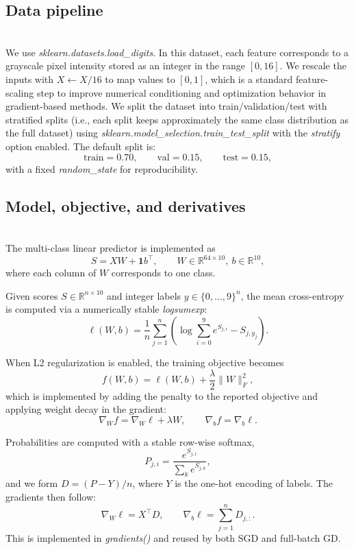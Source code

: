 \subsection{Data pipeline}\;\\
We use \emph{sklearn.datasets.load\_digits}. In this dataset, each feature corresponds to a grayscale pixel intensity stored as an integer in the range $[0,16]$.
We rescale the inputs with $X \leftarrow X/16$ to map values to $[0,1]$, which is a standard feature-scaling step to improve numerical conditioning and optimization behavior in gradient-based methods. \cite[Ch. 12.2.1]{Goodfellow2016}
We split the dataset into train/validation/test with stratified splits (i.e., each split keeps approximately the same class distribution as the full dataset) using \emph{sklearn.model\_selection.train\_test\_split} with the \emph{stratify} option enabled. The default split is:
\[
\text{train}=0.70,\qquad \text{val}=0.15,\qquad \text{test}=0.15,
\]
with a fixed \emph{random\_state} for reproducibility.


\subsection{Model, objective, and derivatives}\;\\
The multi-class linear predictor is implemented as
\[
S = XW + \mathbf{1}b^\top,\qquad W\in\mathbb{R}^{64\times 10},\ b\in\mathbb{R}^{10},
\]
where each column of $W$ corresponds to one class.

Given scores $S\in\mathbb{R}^{n\times 10}$ and integer labels $y\in\{0,\dots,9\}^n$, the mean cross-entropy is computed via a numerically stable \emph{logsumexp}:
\[
\ell(W,b) = \frac{1}{n}\sum_{j=1}^n \left(\log\sum_{i=0}^{9} e^{S_{j,i}} - S_{j,y_j}\right).
\]

When L2 regularization is enabled, the training objective becomes
\[
f(W,b)=\ell(W,b) + \frac{\lambda}{2}\|W\|_F^2,
\]
which is implemented by adding the penalty to the reported objective and applying weight decay in the gradient:
\[
\nabla_W f = \nabla_W \ell + \lambda W,\qquad \nabla_b f = \nabla_b \ell.
\]

Probabilities are computed with a stable row-wise softmax,
\[
P_{j,i} = \frac{e^{S_{j,i}}}{\sum_{k} e^{S_{j,k}}},
\]
and we form $D = (P - Y)/n$, where $Y$ is the one-hot encoding of labels. The gradients then follow:
\[
\nabla_W \ell = X^\top D,\qquad \nabla_b \ell = \sum_{j=1}^n D_{j,:}.
\]
This is implemented in \emph{gradients()} and reused by both SGD and full-batch GD.


